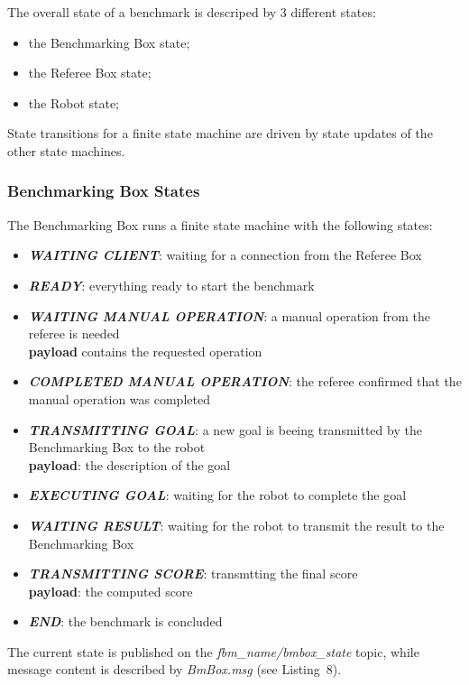 \documentclass[a4paper]{article}
\begin{document}
The overall state of a benchmark is descriped by 3 different states:
\begin{itemize}
  \item the Benchmarking Box state;
  \item the Referee Box state;
  \item the Robot state;
\end{itemize}

State transitions for a finite state machine are driven by state updates of the other state machines.

\subsubsection{Benchmarking Box States}
The Benchmarking Box runs a finite state machine with the following states:
\begin{itemize}
  \item \textbf{\emph{WAITING CLIENT}}: waiting for a connection from the Referee Box
  \item \textbf{\emph{READY}}: everything ready to start the benchmark
  \item \textbf{\emph{WAITING MANUAL OPERATION}}: a manual operation from the referee is needed\\
    \textbf{payload} contains the requested operation
  \item \textbf{\emph{COMPLETED MANUAL OPERATION}}: the referee confirmed that the manual operation was completed
  \item \textbf{\emph{TRANSMITTING GOAL}}: a new goal is beeing transmitted by the Benchmarking Box to the robot\\
    \textbf{payload}: the description of the goal
  \item \textbf{\emph{EXECUTING GOAL}}: waiting for the robot to complete the goal
  \item \textbf{\emph{WAITING RESULT}}: waiting for the robot to transmit the result to the Benchmarking Box
  \item \textbf{\emph{TRANSMITTING SCORE}}: transmtting the final score\\
    \textbf{payload}: the computed score
  \item \textbf{\emph{END}}: the benchmark is concluded
\end{itemize}

The current state is published on the \emph{fbm\_name/bmbox\_state} topic, while message content is described by \emph{BmBox.msg} (see Listing~8).
\end{document}
